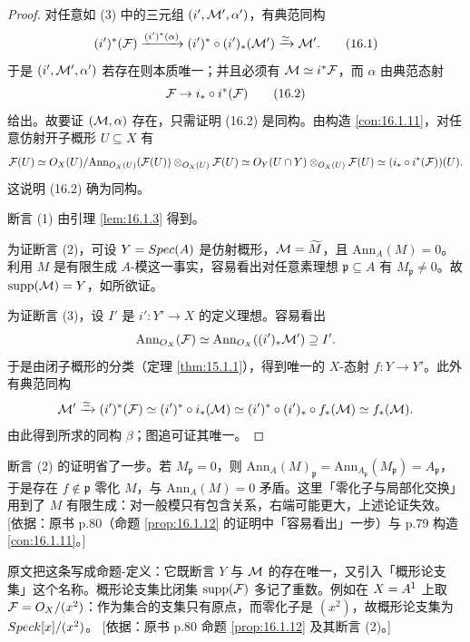 \begin{proof}
对任意如 (3) 中的三元组 $(i',\mathcal{M}',\alpha')$，有典范同构
\begin{equation}
(i')^*(\mathcal{F})\xrightarrow{(i')^*(\alpha)}(i')^*\circ(i')_*(\mathcal{M}')\xrightarrow{\simeq}\mathcal{M}'. \tag{16.1}
\end{equation}
于是 $(i',\mathcal{M}',\alpha')$ 若存在则本质唯一；并且必须有 $\mathcal{M}\simeq i^*\mathcal{F}$，而 $\alpha$ 由典范态射
\begin{equation}
\mathcal{F}\to i_*\circ i^*(\mathcal{F}) \tag{16.2}
\end{equation}
给出。故要证 $(\mathcal{M},\alpha)$ 存在，只需证明 (16.2) 是同构。由构造 \ref{con:16.1.11}，对任意仿射开子概形 $U\subseteq X$ 有
\[
\mathcal{F}(U)\simeq O_X(U)/\mathrm{Ann}_{O_X(U)}(\mathcal{F}(U))\otimes_{O_X(U)}\mathcal{F}(U)\simeq O_Y(U\cap Y)\otimes_{O_X(U)}\mathcal{F}(U)\simeq (i_*\circ i^*(\mathcal{F}))(U).
\]
这说明 (16.2) 确为同构。

断言 (1) 由引理 \ref{lem:16.1.3} 得到。

为证断言 (2)，可设 $Y=Spec(A)$ 是仿射概形，$\mathcal{M}=\widetilde{M}$，且 $\mathrm{Ann}_A(M)=0$。利用 $M$ 是有限生成 $A$-模这一事实，容易看出对任意素理想 $\mathfrak{p}\subseteq A$ 有 $M_{\mathfrak{p}}\neq 0$。故 $\mathrm{supp}(\mathcal{M})=Y$，如所欲证。

为证断言 (3)，设 $I'$ 是 $i'\colon Y'\to X$ 的定义理想。容易看出
\[
\mathrm{Ann}_{O_X}(\mathcal{F})\simeq\mathrm{Ann}_{O_X}((i')_*\mathcal{M}')\supseteq I'.
\]
于是由闭子概形的分类（定理 \ref{thm:15.1.1}），得到唯一的 $X$-态射 $f\colon Y\to Y'$。此外有典范同构
\[
\mathcal{M}'\xrightarrow{\simeq}(i')^*(\mathcal{F})\simeq(i')^*\circ i_*(\mathcal{M})\simeq(i')^*\circ(i')_*\circ f_*(\mathcal{M})\simeq f_*(\mathcal{M}).
\]
由此得到所求的同构 $\beta$；图追可证其唯一。
\end{proof}

\begin{yizhu}
断言 (2) 的证明省了一步。若 $M_{\mathfrak{p}}=0$，则 $\mathrm{Ann}_A(M)_{\mathfrak{p}}=\mathrm{Ann}_{A_{\mathfrak{p}}}(M_{\mathfrak{p}})=A_{\mathfrak{p}}$，于是存在 $f\notin\mathfrak{p}$ 零化 $M$，与 $\mathrm{Ann}_A(M)=0$ 矛盾。这里「零化子与局部化交换」用到了 $M$ 有限生成：对一般模只有包含关系，右端可能更大，上述论证失效。
[依据：原书 p.80（命题 \ref{prop:16.1.12} 的证明中「容易看出」一步）与 p.79 构造 \ref{con:16.1.11}。]
\end{yizhu}

\begin{yizhu}
原文把这条写成命题-定义：它既断言 $Y$ 与 $\mathcal{M}$ 的存在唯一，又引入「概形论支集」这个名称。概形论支集比闭集 $\mathrm{supp}(\mathcal{F})$ 多记了重数。例如在 $X=A^1$ 上取 $\mathcal{F}=O_X/(x^2)$：作为集合的支集只有原点，而零化子是 $(x^2)$，故概形论支集为 $Spec k[x]/(x^2)$。
[依据：原书 p.80 命题 \ref{prop:16.1.12} 及其断言 (2)。]
\end{yizhu}

